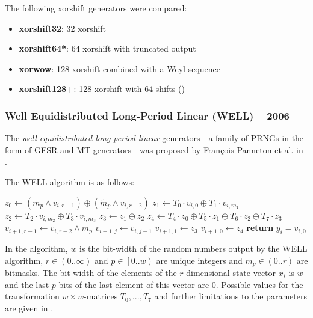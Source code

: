     The following xorshift generators were compared:
    \begin{itemize}
        \itemsep0em
        \item \textbf{xorshift32}: \SI{32}{\bit} xorshift
        \item \textbf{xorshift64*}: \SI{64}{\bit} xorshift with truncated output
        \item \textbf{xorwow}: \SI{128}{\bit} xorshift combined with a Weyl sequence
        \item \textbf{xorshift128+}: \SI{128}{\bit} xorshift with \SI{64}{\bit} shifts (\cite{Vigna:2017})
    \end{itemize}

\subsubsection[Well Equidistributed Long-Period Linear (WELL) -- 2006]{Well Equidistributed Long-Period Linear (WELL) -- 2006} \label{subsubsec:well}

    The \emph{well equidistributed long-period linear} generators---a family of PRNGs in the form of GFSR and MT generators---was proposed by François Panneton et al. in \cite{Panneton:2006}.

    The WELL algorithm is as follows:
    \begin{algorithmic}[]
        \State $z_0 \leftarrow \left(m_p \land v_{i, r - 1}\right) \oplus \left(\widetilde{m}_p \land v_{i, r - 2}\right)$
        \State $z_1 \leftarrow T_0 \cdot v_{i, 0} \oplus T_1 \cdot v_{i, m_1}$
        \State $z_2 \leftarrow T_2 \cdot v_{i, m_2} \oplus T_3 \cdot v_{i, m_3}$
        \State $z_3 \leftarrow z_1 \oplus z_2$
        \State $z_4 \leftarrow T_4 \cdot z_0 \oplus T_5 \cdot z_1 \oplus T_6 \cdot z_2 \oplus T_7 \cdot z_3$
        \State $v_{i + 1, r - 1} \leftarrow v_{i, r - 2} \land m_p$
            \State $v_{i + 1, j} \leftarrow v_{i, j - 1}$
        \EndFor
        \State $v_{i + 1, 1} \leftarrow z_3$
        \State $v_{i + 1, 0} \leftarrow z_4$
        \State \textbf{return} $y_i = v_{i, 0}$
    \end{algorithmic}
    In the algorithm, $w$ is the bit-width of the random numbers output by the WELL algorithm, $r \in \left(0.. \infty\right)$ and $p \in \left[0.. w\right)$ are unique integers and $m_p \in \left(0.. r\right)$ are bitmasks. The bit-width of the elements of the $r$-dimensional state vector $x_i$ is $w$ and the last $p$ bits of the last element of this vector are $0$. Possible values for the transformation $w{\times}w$-matrices $T_0, ..., T_7$ and further limitations to the parameters are given in \cite{Panneton:2006}.

